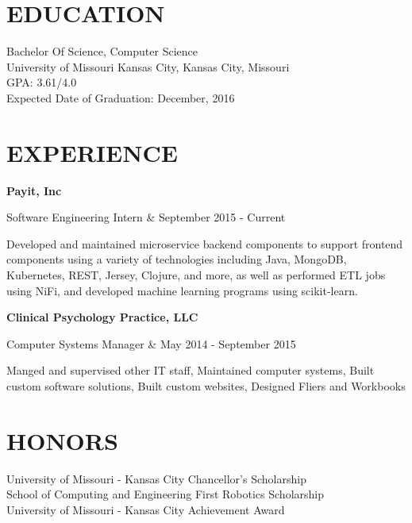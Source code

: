 \documentclass[margin,11pt]{res} %
\begin{document}

\address{ 5601 Lydia Avenue \\ Kansas City, Missouri 64112 \\
(913) 908-6148 \\ cdrm4@mail.umkc.edu \\}

\begin{resume}
 
\section{EDUCATION}       
 Bachelor Of Science, Computer Science  \\
                University of Missouri Kansas City, Kansas City, Missouri \\ 
                GPA: 3.61/4.0 \\
                Expected Date of Graduation: December, 2016
 
 
\section{EXPERIENCE}      

		{\bf Payit, Inc} \\
			\begin{ncolumn}{2}
			Software Engineering Intern & September 2015 - Current
			\end{ncolumn}
			Developed and maintained microservice backend components to support frontend components using a variety of technologies including Java, MongoDB, Kubernetes, REST, Jersey, Clojure, and more, as well as performed ETL jobs using NiFi, and developed machine learning programs using scikit-learn.
			
		{\bf Clinical Psychology Practice, LLC} \\
			\begin{ncolumn}{2}
			Computer Systems Manager & May 2014 - September 2015
			\end{ncolumn}
			Manged and supervised other IT staff, Maintained computer systems, Built custom software solutions, Built custom websites, Designed Fliers and Workbooks
		
 
 
\section{HONORS}
University of Missouri - Kansas City Chancellor's Scholarship \\
School of Computing and Engineering First Robotics Scholarship \\ 
University of Missouri - Kansas City Achievement Award  \\


\end{resume}
\end{document}
